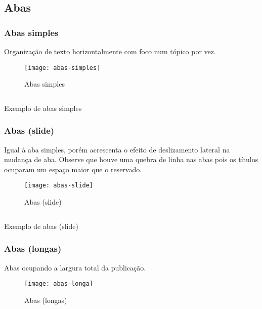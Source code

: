 \subsection{Abas}


\subsubsection{Abas simples}

Organização de texto horizontalmente com foco num tópico por vez.

\begin{figure}[!ht]
    \centering
    \texttt{[image: abas-simples]}
    \caption{Abas simples}\label{RS0001:fig:abas-simples}
\end{figure}

\begin{code}
    \inputminted[label=abas-slide.html]{html}{../RS0001/anexos/abas-simples.html}
    \caption{Exemplo de abas simples}\label{RS0001:code:exemplo-abas-simples}
\end{code}


\subsubsection{Abas (slide)}

Igual à aba simples, porém acrescenta o efeito de deslizamento lateral na mudança de aba. Observe que houve uma quebra de linha nas abas pois os títulos ocuparam um espaço maior que o reservado.

\begin{figure}[!ht]
    \centering
    \texttt{[image: abas-slide]}
    \caption{Abas (slide)}\label{RS0001:fig:abas-slide}
\end{figure}

\begin{code}
    \inputminted[label=abas-slide.html]{html}{../RS0001/anexos/abas-slide.html}
    \caption{Exemplo de abas (slide)}\label{RS0001:code:exemplo-abas-slide}
\end{code}


\subsubsection{Abas (longas)}

Abas ocupando a largura total da publicação.

\begin{figure}[!ht]
    \centering
    \texttt{[image: abas-longa]}
    \caption{Abas (longas)}\label{RS0001:fig:abas-longa}
\end{figure}


